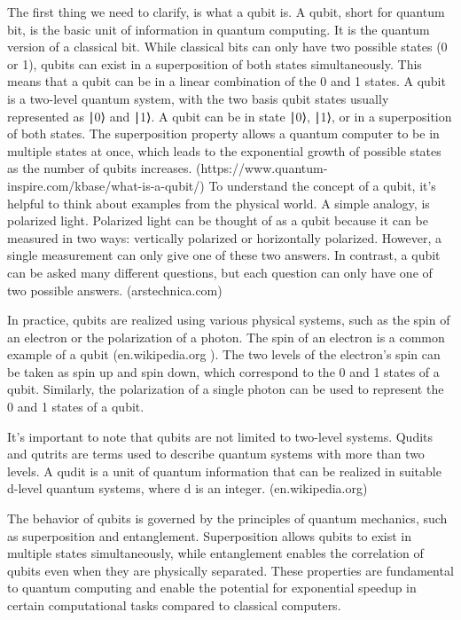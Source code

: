 \documentclass[pra,onecolumn,superscriptaddress]{revtex4}%
\begin{document}
The first thing we need to clarify, is what a qubit is. 
A qubit, short for quantum bit, is the basic unit of information in quantum computing. It is the quantum version of a classical bit. While classical bits can only have two possible states (0 or 1), qubits can exist in a superposition of both states simultaneously. This means that a qubit can be in a linear combination of the 0 and 1 states. A qubit is a two-level quantum system, with the two basis qubit states usually represented as ∣0⟩ and ∣1⟩. A qubit can be in state ∣0⟩, ∣1⟩, or in a superposition of both states. The superposition property allows a quantum computer to be in multiple states at once, which leads to the exponential growth of possible states as the number of qubits increases.
(https://www.quantum-inspire.com/kbase/what-is-a-qubit/)
To understand the concept of a qubit, it's helpful to think about examples from the physical world. A simple analogy, is polarized light. Polarized light can be thought of as a qubit because it can be measured in two ways: vertically polarized or horizontally polarized. However, a single measurement can only give one of these two answers. In contrast, a qubit can be asked many different questions, but each question can only have one of two possible answers.
(arstechnica.com)

In practice, qubits are realized using various physical systems, such as the spin of an electron or the polarization of a photon. The spin of an electron is a common example of a qubit (en.wikipedia.org ). The two levels of the electron's spin can be taken as spin up and spin down, which correspond to the 0 and 1 states of a qubit. Similarly, the polarization of a single photon can be used to represent the 0 and 1 states of a qubit.

It's important to note that qubits are not limited to two-level systems. Qudits and qutrits are terms used to describe quantum systems with more than two levels. A qudit is a unit of quantum information that can be realized in suitable d-level quantum systems, where d is an integer. 
(en.wikipedia.org)

The behavior of qubits is governed by the principles of quantum mechanics, such as superposition and entanglement. Superposition allows qubits to exist in multiple states simultaneously, while entanglement enables the correlation of qubits even when they are physically separated. These properties are fundamental to quantum computing and enable the potential for exponential speedup in certain computational tasks compared to classical computers.
\end{document}
